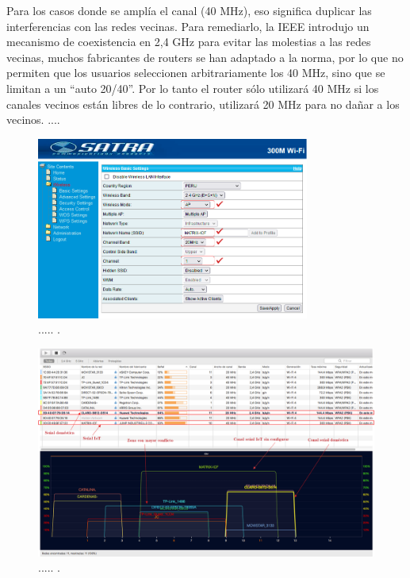 Para los casos donde se amplía el canal (40 MHz), eso significa duplicar las interferencias con las redes vecinas. Para remediarlo, la IEEE introdujo un mecanismo de coexistencia en 2,4 GHz para evitar las molestias a las redes vecinas, muchos fabricantes de routers se han adaptado a la norma, por lo que no permiten que los usuarios seleccionen arbitrariamente los 40 MHz, sino que se limitan a un ``auto 20/40''. Por lo tanto el router sólo utilizará 40 MHz si los canales vecinos están libres de lo contrario, utilizará 20 MHz para no dañar a los vecinos. ....

\begin{figure}[htpb]
\centering 
\includegraphics[width=0.8\textwidth]{./Figures/configuracionancho.png}
\caption{..... .}
\label{fig:configuracionancho}
\end{figure}


\begin{landscape} %
\begin{figure}[htpb]
\centering 
\includegraphics[width=1.5\textwidth]{./Figures/wifi/01-doc.png}
\caption{..... .}
\label{fig:solapamiento}
\end{figure}
\end{landscape} %



